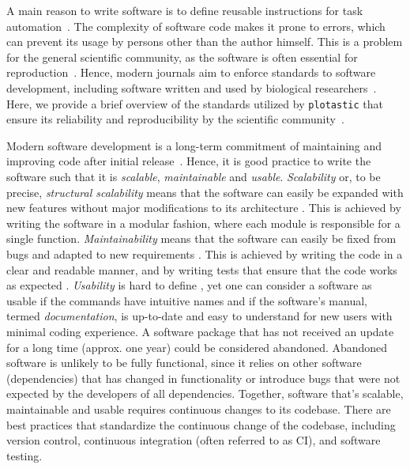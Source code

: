 \label{sec:intro_code_quality}
A main reason to write software is to define reusable instructions for task
automation~\cite{pichlerReusabilityConceptProcess1998}.
The complexity of software code makes it prone to errors, which can prevent
its usage by persons other than the author himself. This is a problem for the
general scientific community, as the software is often essential for
reproduction~\cite{sandveTenSimpleRules2013}. Hence, modern journals aim to
enforce standards to software development, including software written and used
by biological researchers~\cite{smithJournalOpenSource2018}. Here, we provide a
brief overview of the standards utilized by \texttt{plotastic} that ensure
its reliability and reproducibility by the scientific
community~\cite{pengReproducibleResearchComputational2011}.


Modern software development is a long-term commitment of maintaining and
improving code after initial release~\cite{boswellArtReadableCode2011}. Hence,
it is good practice to write the software such that it is \emph{scalable},
\emph{maintainable} and \emph{usable}. \emph{Scalability} or, to be precise,
\emph{structural scalability} means that the software can easily be expanded
with new features without major modifications to its architecture
\cite{bondiCharacteristicsScalabilityTheir2000}. This is achieved by writing the
software in a modular fashion, where each module is responsible for a single
function. \emph{Maintainability} means that the software can easily be fixed
from bugs and adapted to new requirements \cite{kazmanMaintainability2020}. This
is achieved by writing the code in a clear and readable manner, and by writing
tests that ensure that the code works as
expected \cite{boswellArtReadableCode2011}. \emph{Usability} is hard to
define \cite{brookeSUSQuickDirty1996}, yet one can consider a software as usable
if the commands have intuitive names and if the software's manual, termed
\emph{documentation}, is up-to-date and easy to understand for new users with
minimal coding experience. A software package that has not received an update
for a long time (approx. one year) could be considered abandoned. Abandoned
software is unlikely to be fully functional, since it relies on other software
(dependencies) that has changed in functionality or introduce bugs that were not
expected by the developers of all dependencies. Together, software that's
scalable, maintainable and usable requires continuous changes to its codebase.
There are best practices that standardize the continuous change of the codebase,
including version control, continuous integration (often referred to as CI), and
software testing.

